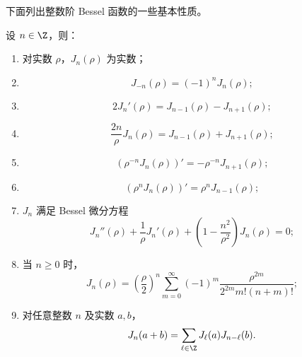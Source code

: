 下面列出整数阶 Bessel 函数的一些基本性质。

\begin{proposition}\label{prop:bessel-identities}
	设 $n\in\Z$，则：
	\begin{enumerate}[label=(\alph*)]
		\item 对实数 $\rho$，$J_n(\rho)$ 为实数；

		\item
		\[
		J_{-n}(\rho)=(-1)^nJ_n(\rho);
		\]

		\item
		\[
		2J_n'(\rho)=J_{n-1}(\rho)-J_{n+1}(\rho);
		\]

		\item
		\[
		\frac{2n}{\rho}J_n(\rho)
		=J_{n-1}(\rho)+J_{n+1}(\rho);
		\]

		\item
		\[
		\left(\rho^{-n}J_n(\rho)\right)'
		=-\rho^{-n}J_{n+1}(\rho);
		\]

		\item
		\[
		\left(\rho^nJ_n(\rho)\right)'
		=\rho^nJ_{n-1}(\rho);
		\]

		\item $J_n$ 满足 Bessel 微分方程
		\[
		J_n''(\rho)+\frac1\rho J_n'(\rho)
		+\left(1-\frac{n^2}{\rho^2}\right)J_n(\rho)=0;
		\]

		\item 当 $n\geq0$ 时，
		\[
		J_n(\rho)
		=\left(\frac{\rho}{2}\right)^n
		\sum_{m=0}^\infty(-1)^m
		\frac{\rho^{2m}}{2^{2m}m!(n+m)!};
		\]

		\item 对任意整数 $n$ 及实数 $a,b$，
		\[
		J_n(a+b)=\sum_{\ell\in\Z}J_\ell(a)J_{n-\ell}(b).
		\]
	\end{enumerate}
\end{proposition}
\newpage
